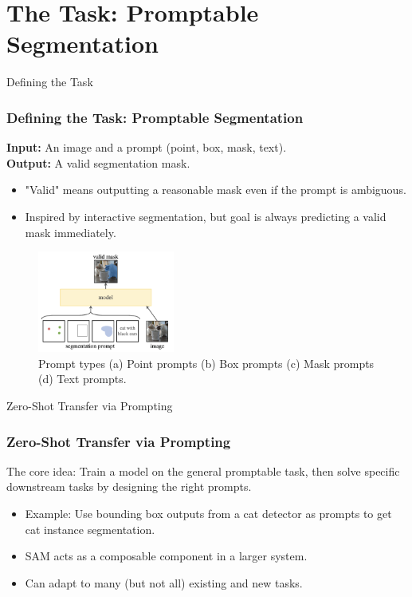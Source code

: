 \documentclass{beamer}
\begin{document}
\section{The Task: Promptable Segmentation}

\begin{frame}{Defining the Task}
    \frametitle{Defining the Task: Promptable Segmentation}
    \textbf{Input:} An image and a prompt (point, box, mask, text). \\
    \textbf{Output:} A valid segmentation mask.
    \begin{itemize}
        \item "Valid" means outputting a reasonable mask even if the prompt is ambiguous.
        \item Inspired by interactive segmentation, but goal is always predicting a valid mask immediately.
    \end{itemize}
    \vfill
    \begin{figure}
        \centering
        \includegraphics[width=0.4\textwidth]{figures/prompt_types.png}
        \caption{\tiny Prompt types (a) Point prompts (b) Box prompts (c) Mask prompts (d) Text prompts.}
    \end{figure}
\end{frame}

\begin{frame}{Zero-Shot Transfer via Prompting}
    \frametitle{Zero-Shot Transfer via Prompting}
    The core idea: Train a model on the general promptable task, then solve specific downstream tasks by designing the right prompts.
    \begin{itemize}
        \item Example: Use bounding box outputs from a cat detector as prompts to get cat instance segmentation.
        \item SAM acts as a composable component in a larger system.
        \item Can adapt to many (but not all) existing and new tasks.
    \end{itemize}
\end{frame}
\end{document}
